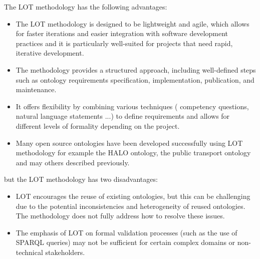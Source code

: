 The LOT methodology has the following advantages:
\begin{itemize}
    \item The LOT methodology is designed to be lightweight and agile, which allows for faster iterations and easier integration with software development practices and it is particularly well-suited for projects that need rapid, iterative development.

    \item The methodology provides a structured approach, including well-defined steps such as ontology requirements specification, implementation, publication, and maintenance.

    \item It offers flexibility by combining various techniques ( competency questions, natural language statements ...) to define requirements and allows for different levels of formality depending on the project.

    \item Many open source ontologies have been developed successfully using LOT methodology for example the HALO ontology, the public transport ontology and may others described previously.
\end{itemize}
but the LOT methodology has two disadvantages:
\begin{itemize}
    \item LOT encourages the reuse of existing ontologies, but this can be challenging due to the potential inconsistencies and heterogeneity of reused ontologies. The methodology does not fully address how to resolve these issues.

    \item The emphasis of LOT on formal validation processes (such as the use of SPARQL queries) may not be sufficient for certain complex domains or non-technical stakeholders.
\end{itemize}

